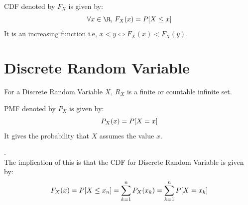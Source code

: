 \begin{definition}
  \label{def:cumulative-distribution-function} CDF denoted
  by \(F_X\) is given by:\\ 
  \begin{equation}
    \label{eqn:cumulative-distribution-function}
    \begin{displaystyle} \forall x \in  \R\text{, }F_X(x) =
    P[X\le x] \end{displaystyle} 
  \end{equation} It is an
  increasing function i.e, \(x<y \iff F_X(x)<F_X(y)\).
\end{definition}

\section{Discrete Random Variable}
\label{sec:discrete-random-variable} For a Discrete Random
Variable \(X\), \(R_X\) is a finite or countable infinite
set.

\begin{definition}
  \label{def:probability-mass-function} PMF denoted by
  \(P_X\) is given by:\\ 
  \begin{equation}
    \label{eqn:probability-mass-function}
    \begin{displaystyle} P_X(x) = P[X=x]
    \end{displaystyle}
  \end{equation} It gives the
  probability that \(X\) assumes the value \(x\).
\end{definition}

.\\[4pt] The implication of this is that the CDF for
Discrete Random Variable is given by:
\begin{equation}
  \label{eqn:cdf-discrete-random-variable}
  \begin{displaystyle} F_X(x) = P[X\le x_n] =
    \sum_{k=1}^{n} P_X(x_k) =  \sum_{k=1}^{n} P[X=x_k]
  \end{displaystyle}
\end{equation}

